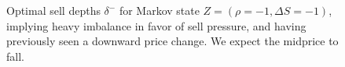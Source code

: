 \documentclass[12pt,letterpaper]{report}
\begin{document}
\begin{figure}
\begin{subfigure}{\linewidth}
  \centering
   
\end{subfigure}%
  \caption{Optimal sell depths $\delta^{-}$ for Markov state $Z=(\rho = -1, \Delta S = -1)$, implying heavy imbalance in favor of sell pressure, and having previously seen a downward price change. We expect the midprice to fall.}
\end{figure}
\end{document}
